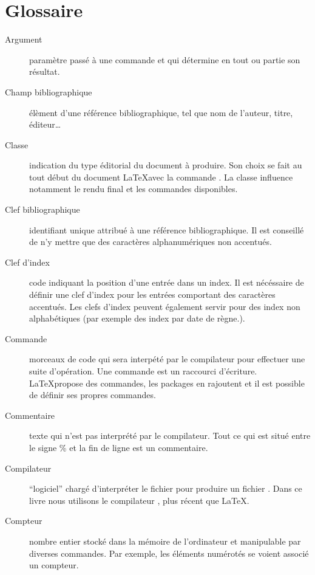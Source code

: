 \chapter{Glossaire}


\begin{description}
\item[Argument] paramètre passé à une commande et qui détermine en tout ou partie son résultat.


\item[Champ bibliographique] élèment d'une référence bibliographique, tel que nom de l'auteur, titre, éditeur…


\item[Classe] indication du type éditorial du document à produire. Son choix se fait au tout début du document \LaTeX avec la commande . La classe influence notamment le rendu final et les commandes disponibles.

\item[Clef bibliographique] identifiant unique attribué à une référence bibliographique. Il est conseillé de n'y mettre que des caractères alphanumériques non accentués.

\item[Clef d'index] code indiquant la position d'une entrée dans un index. Il est nécéssaire de définir une clef d'index pour les entrées comportant des caractères accentués. Les clefs d'index peuvent également servir pour des index non alphabétiques (par exemple des index par date de règne.).

\item[Commande] morceaux de code qui sera interpété par le compilateur pour effectuer une suite d'opération. Une commande est un raccourci d'écriture. \LaTeX propose des commandes, les packages en rajoutent et il est possible de définir ses propres commandes.

\item[Commentaire] texte qui n'est pas interprété par le compilateur. Tout ce qui est situé entre le signe \% et la fin de ligne est un commentaire.

\item[Compilateur] \enquote{logiciel} chargé d'interpréter le fichier  pour produire un fichier . Dans ce livre nous utilisons le compilateur \XeLaTeX, plus récent que \LaTeX.

\item[Compteur] nombre entier stocké dans la mémoire de l'ordinateur et manipulable par diverses commandes. Par exemple, les éléments numérotés se voient associé un compteur.



\end{description}

